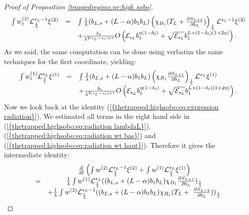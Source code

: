 \documentclass[11pt,a4paper,reqno]{amsart}
\theoremstyle{remark}
\numberwithin{equation}{section}
\begin{document}
\begin{proof}[Proof of Proposition \ref{trappedregime:pr:high sobo}]
\begin{equation} \label{thetrapped:highsobo:eq:radiation wt bas}
\begin{array}{r c l}
\int w^{(2)}_t \mathcal{L}_{\frac{1}{\lambda}}^{s_L-1} \xi^{(2)} &=&  \int \frac{1}{\lambda} (b_{L,s}+(L-\alpha)b_1b_L)\left(\chi_{B_1}(T_L+\frac{\partial S_{L+2}}{\partial b_L}) \right)_{\frac{1}{\lambda}}\mathcal{L}^{s_L-1} \xi ^{(2)} \\
&&+\frac{b_1}{\lambda^{2(s_L-s_c)+1}} O\left(\mathcal{E}_{s_L}b_1^{\eta(1-\delta_0)}+\sqrt{\mathcal{E}_{s_L}}b_1^{L+(1-\delta_0)(1+2\eta)}\right) .
\end{array}
\end{equation}
As we said, the same computation can be done using verbatim the same techniques for the first coordinate, yielding:
\begin{equation} \label{thetrapped:highsobo:eq:radiation wt haut}
\begin{array}{r c l}
\int w^{(1)}_t \mathcal{L}_{\frac{1}{\lambda}}^{s_L} \xi^{(1)} &=&  \int \frac{1}{\lambda} (b_{L,s}+(L-\alpha)b_1b_L)\left(\chi_{B_1}\frac{\partial S_{L+1}}{\partial b_L} \right)_{\frac{1}{\lambda}}\mathcal{L}^{s_L} \xi ^{(1)} \\
&&+\frac{b_1}{\lambda^{2(s_L-s_c)+1}} O\left(\mathcal{E}_{s_L}b_1^{\eta(1-\delta_0)}+\sqrt{\mathcal{E}_{s_L}}b_1^{L+(1-\delta_0)(1+2\eta)}\right) .
\end{array}
\end{equation}
Now we look back at the identity {{\rm (\ref{{thetrapped:highsobo:eq:expression radiation}})}}. We estimated all terms in the right hand side in {{\rm (\ref{{thetrapped:highsobo:eq:radiation lambdaL}})}}, {{\rm (\ref{{thetrapped:highsobo:eq:radiation wt bas}})}} and {{\rm (\ref{{thetrapped:highsobo:eq:radiation wt haut}})}}. Therefore it gives the intermediate identity:
\begin{equation} \label{thetrapped:highsobo:radiation intermediaire}
\begin{array}{r c l}
& \frac{d}{dt} \left( \int w^{(2)}\mathcal{L}_{\frac{1}{\lambda}}^{s_L-1} \xi^{(2)} + \int w^{(1)}\mathcal{L}_{\frac{1}{\lambda}}^{s_L} \xi^{(1)} \right) \\
=& \frac{1}{\lambda} \int w^{(1)}\mathcal{L}_{\frac{1}{\lambda}}^{s_L}((b_{L,s}+(L-\alpha)b_1b_L)\chi_{B_1} \frac{\partial S_{L+1}}{\partial b_L})_{\frac{1}{\lambda}} \\
&+ \frac{1}{\lambda} \int w^{(2)}\mathcal{L}_{\frac{1}{\lambda}}^{s_L-1}((b_{L,s}+(L-\alpha)b_1b_L)\chi_{B_1}(T_L+\ \frac{\partial S_{L+2}}{\partial b_L}))_{\frac{1}{\lambda}} \\

\end{array}
\end{equation}
\end{proof}
\end{document}
